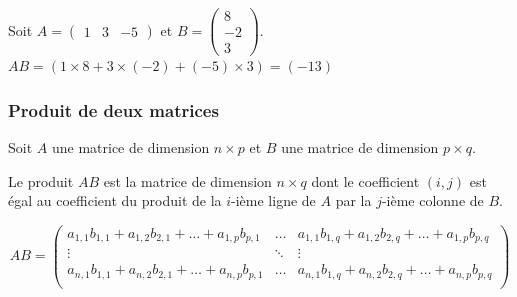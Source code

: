 \documentclass[11pt,fleqn]{book} %
\begin{document}
\begin{example}Soit $A=\begin{pmatrix}
1 & 3 & -5
\end{pmatrix}$ et $B=\begin{pmatrix}
8 \\ -2 \\ 3
\end{pmatrix}$. $AB = ( 1 \times 8 + 3 \times (-2) + (-5) \times 3) = (-13) $\end{example}
\newpage
\subsubsection{Produit de deux matrices}

\begin{definition}
Soit $A$ une matrice de dimension $n \times p$ et $B$ une matrice de dimension $p \times q$.

Le produit $AB$ est la matrice de dimension $n \times q$ dont le coefficient $(i,j)$ est égal au coefficient du produit de la $i$-ième ligne de $A$ par la $j$-ième colonne de $B$.

\[AB = \begin{pmatrix}
a_{1,1}b_{1,1}+a_{1,2}b_{2,1}+\dots + a_{1,p}b_{p,1} & \dots & a_{1,1}b_{1,q}+a_{1,2}b_{2,q}+\dots + a_{1,p}b_{p,q}\\
\vdots & \ddots & \vdots \\
 a_{n,1}b_{1,1}+a_{n,2}b_{2,1}+\dots + a_{n,p}b_{p,1} & \dots & a_{n,1}b_{1,q}+a_{n,2}b_{2,q}+\dots + a_{n,p}b_{p,q}\\
\end{pmatrix}\]

\end{definition}
\end{document}

